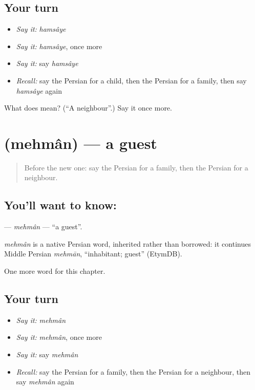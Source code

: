 \subsection*{Your turn}
\begin{itemize}
\raggedright
  \item \emph{Say it:} \emph{hamsâye}
  \item \emph{Say it:} \emph{hamsâye}, once more
  \item \emph{Say it:} say \emph{hamsâye}
  \item \emph{Recall:} say the Persian for a child, then the Persian for a family, then say \emph{hamsâye} again
\end{itemize}

\begin{tcolorbox}[breakable,colback=teal!4,colframe=teal!35!black,title={Before you move on}]
What does  mean? (\textquotedblleft{}A neighbour\textquotedblright{}.) Say it once more.
\end{tcolorbox}
\section[\texorpdfstring{\fa{مهمان} (mehmân)}{مهمان (mehmân)}]{ (mehmân) — a guest}

\label{lesson:FA-C34-mehman}



\begin{quote}
Before the new one: say the Persian for a family, then the Persian for a neighbour.
\end{quote}

\subsection*{You'll want to know: }
\textbf{} — \emph{mehmân} — \textquotedblleft{}a guest\textquotedblright{}.

\begin{cousinweb}
\emph{mehmân} is a native Persian word, inherited rather than borrowed: it continues Middle Persian \emph{mehmān}, \textquotedblleft{}inhabitant; guest\textquotedblright{} (EtymDB).
\end{cousinweb}

\begin{grammarlens}[title={What you've built}]
One more word for this chapter.
\end{grammarlens}

\subsection*{Your turn}
\begin{itemize}
\raggedright
  \item \emph{Say it:} \emph{mehmân}
  \item \emph{Say it:} \emph{mehmân}, once more
  \item \emph{Say it:} say \emph{mehmân}
  \item \emph{Recall:} say the Persian for a family, then the Persian for a neighbour, then say \emph{mehmân} again
\end{itemize}

